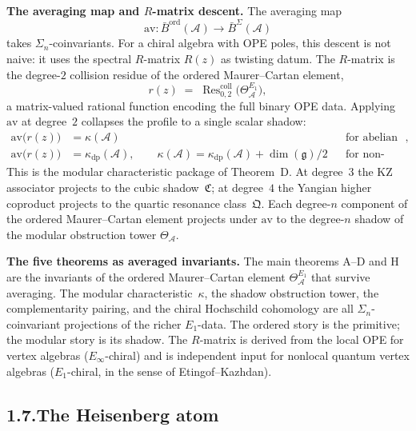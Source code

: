 \documentclass[11pt]{report}
\theoremstyle{definition}
\theoremstyle{remark}
\providecommand{\cA}{\mathcal{A}}
\providecommand{\barB}{\bar{B}}
\providecommand{\fg}{\mathfrak{g}}
\numberwithin{equation}{section}
\begin{document}
\medskip
\noindent\textbf{The averaging map and $R$-matrix descent.}\enspace
The averaging map
\[
\mathrm{av}\colon\barB^{\mathrm{ord}}(\cA)\longrightarrow\barB^{\Sigma}(\cA)
\]
takes $\Sigma_n$-coinvariants. For a chiral algebra with OPE poles,
this descent is not naive: it uses the spectral $R$-matrix $R(z)$ as
twisting datum. The $R$-matrix is the degree-$2$ collision residue of
the ordered Maurer--Cartan element,
\[
r(z)\;=\;\operatorname{Res}^{\mathrm{coll}}_{0,2}\bigl(\Theta^{E_1}_{\cA}\bigr),
\]
a matrix-valued rational function encoding the full binary OPE data.
Applying $\mathrm{av}$ at degree~$2$ collapses the profile to a single
scalar shadow:
\begin{equation}\label{eq:av-organizing}
\begin{aligned}
\mathrm{av}\bigl(r(z)\bigr) &= \kappa(\cA)
&& \text{for abelian and scalar families},\\
\mathrm{av}\bigl(r(z)\bigr) &= \kappa_{\mathrm{dp}}(\cA), \qquad
\kappa(\cA) = \kappa_{\mathrm{dp}}(\cA) + \dim(\fg)/2
&& \text{for non-abelian affine Kac--Moody.}
\end{aligned}
\end{equation}
This is the modular characteristic package of Theorem~D. At degree~$3$ the KZ
associator projects to the cubic shadow~$\mathfrak C$; at degree~$4$
the Yangian higher coproduct projects to the quartic resonance
class~$\mathfrak Q$. Each degree-$n$ component of the ordered
Maurer--Cartan element projects under $\mathrm{av}$ to the degree-$n$
shadow of the modular obstruction tower $\Theta_{\cA}$.

\medskip
\noindent\textbf{The five theorems as averaged invariants.}\enspace
The main theorems A--D and H are the invariants of the ordered
Maurer--Cartan element $\Theta^{E_1}_{\cA}$ that survive averaging.
The modular characteristic~$\kappa$, the shadow obstruction tower, the
complementarity pairing, and the chiral Hochschild cohomology are all
$\Sigma_n$-coinvariant projections of the richer $E_1$-data. The
ordered story is the primitive; the modular story is its shadow. The
$R$-matrix is derived from the local OPE for vertex algebras
($E_\infty$-chiral) and is independent input for nonlocal quantum
vertex algebras ($E_1$-chiral, in the sense of Etingof--Kazhdan).

\subsection*{1.7.\enspace The Heisenberg atom}
\end{document}
